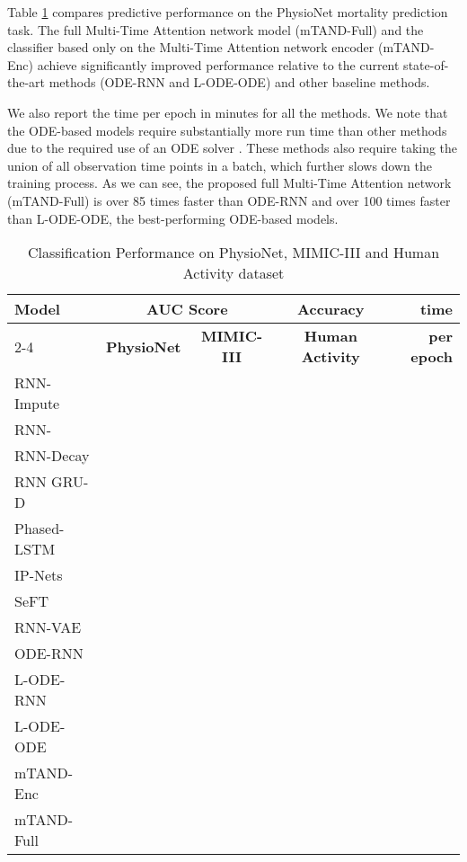 Table \ref{table:classif} compares predictive performance on the PhysioNet mortality prediction task. The full Multi-Time Attention network model (mTAND-Full) and the classifier based only on the Multi-Time Attention network encoder (mTAND-Enc) achieve significantly improved performance relative to the current state-of-the-art methods (ODE-RNN and L-ODE-ODE) and other baseline methods. 

We also report the time per epoch in minutes for all the methods. We note that the ODE-based models require substantially more run time than other methods due to the required use of an ODE solver \citep{neural_ode2018, Rubanova2019}. These methods also require taking the union of all observation time points in a batch, which further slows down the training process. As we can see, the proposed full Multi-Time Attention network (mTAND-Full) is over 85 times faster than ODE-RNN and over 100 times faster than L-ODE-ODE, the best-performing ODE-based models.









\begin{table}[t]
\centering
\footnotesize
    \caption{Classification Performance on PhysioNet, MIMIC-III and Human Activity dataset}
    \label{table:classif}
     \begin{tabular}[h]{l c c c r}
        \toprule
        \multirow{2}{*}{\bf Model} & \multicolumn{2}{c}{\bf AUC Score} & {\bf Accuracy} & \multirow{2}{*}{\bf time}\\
        \cmidrule{2-4}
        & {\bf PhysioNet} & {\bf MIMIC-III} & {\bf Human Activity} & {\bf per epoch}\\
        \midrule
        RNN-Impute	    &  &  &  & \\
        RNN-	&  &  &  & \\
        RNN-Decay	    &  &  &  & \\
        RNN GRU-D	    &  &  &  & \\
        Phased-LSTM     &  &  &  & \\    
        IP-Nets	        &  &  &  & \\
        SeFT	        &  &  &  & \\
        RNN-VAE	        &  &  &  & \\
        ODE-RNN	        &  &  &  & \\
        L-ODE-RNN 	    &  &  &  & \\
        L-ODE-ODE	    &  &  &  & \\
        \midrule 
        {mTAND-Enc}	&  &  &  & \\
        {mTAND-Full}&  &  &  & \\
        \bottomrule
    \end{tabular}
\end{table}




